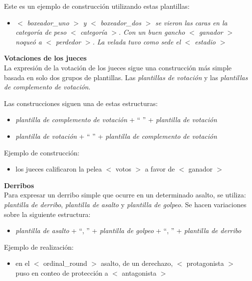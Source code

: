     Este es un ejemplo de construcción utilizando estas plantillas:
    \begin{itemize}
        \item \textit{$<$ boxeador\_uno $>$ y $<$ boxeador\_dos $>$ se vieron las caras en la categoría de peso $<$ categoría $>$. Con un buen 
        gancho $<$ ganador $>$ noqueó a $<$ perdedor $>$. La velada tuvo como sede el $<$ estadio $>$}
    \end{itemize}


    \textbf{Votaciones de los jueces}\\

    La expresión de la votación de los jueces sigue una construcción más simple basada en solo dos grupos de plantillas. 
Las \textit{plantillas de votación} y las \textit{plantillas de complemento de votación}.
    
    Las construcciones siguen una de estas estructuras:
    \begin{itemize}
        \item \textit{plantilla de complemento de votación} + “ ” + \textit{plantilla de votación}
        \item \textit{plantilla de votación} + “ ” + \textit{plantilla de complemento de votación}
    \end{itemize}

    Ejemplo de construcción:
    \begin{itemize}
        \item los jueces calificaron  la pelea $<$ votos $>$ a favor de $<$ ganador $>$
    \end{itemize}



    \textbf{Derribos}\\

    Para expresar un derribo simple que ocurre en un determinado asalto, se utiliza: \textit{plantilla de derribo}, 
    \textit{plantilla de asalto} y \textit{plantilla de golpeo}. Se hacen variaciones sobre la siguiente estructura:
    \begin{itemize}
        \item \textit{plantilla de asalto} + “, ” + \textit{plantilla de golpeo} + “, ” + \textit{plantilla de derribo}
    \end{itemize}
    Ejemplo de realización:
    \begin{itemize}
        \item en el $<$ ordinal\_round $>$ asalto, de un derechazo, $<$ protagonista $>$ puso en conteo de protección a $<$ antagonista $>$
    \end{itemize}

